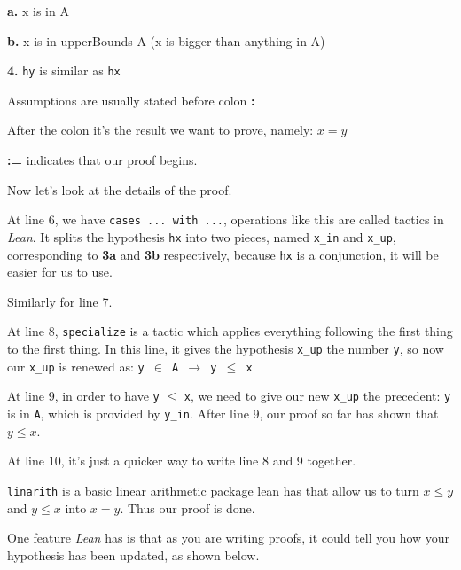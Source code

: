 \documentclass[a4paper]{article}
\theoremstyle{bfnote} %
\theoremstyle{bfnote}                  %
\theoremstyle{example}                       %
\theoremstyle{remark}                       %
\numberwithin{equation}{section}
\begin{document}
\quad\textbf{a.} x is in A

\quad\textbf{b.} x is in upperBounds A (x is bigger than anything in A)

\textbf{4. }\texttt{hy} is similar as \texttt{hx} 

Assumptions are usually stated before colon \textbf{:}

After the colon it's the result we want to prove, namely: $x = y$

\textbf{:=} indicates that  our proof begins.

Now let's look at the details of the proof.

At line 6, we have \texttt{cases ... with ...}, operations like this are called tactics in \textit{Lean}. It splits the hypothesis \texttt{hx} into two pieces, named \texttt{x\_in} and \texttt{x\_up}, corresponding to \textbf{3a} and \textbf{3b} respectively, because \texttt{hx} is a conjunction, it will be easier for us to use.

Similarly for line 7.

At line 8, \texttt{specialize} is a tactic which applies everything following the first thing to the first thing. In this line, it gives the hypothesis \texttt{x\_up} the number \texttt{y}, so now our \texttt{x\_up} is renewed as: \texttt{y $\in$ A $\to$ y $\le$ x}

At line 9, in order to have \texttt{y} $\le$ \texttt{x}, we need to give our new \texttt{x\_up} the precedent: \texttt{y} is in \texttt{A}, which is provided by  \texttt{y\_in}. After line 9, our proof so far has shown that $y \le x$.

At line 10, it's just a quicker way to write line 8 and 9 together.

\texttt{linarith} is a basic linear arithmetic package lean has that allow us to turn $ x \le y$ and $y \le x$ into $x =y$. Thus our proof is done.

One feature \textit{Lean} has is that as you are writing proofs, it could tell you how your hypothesis has been updated, as shown below.
\end{document}

